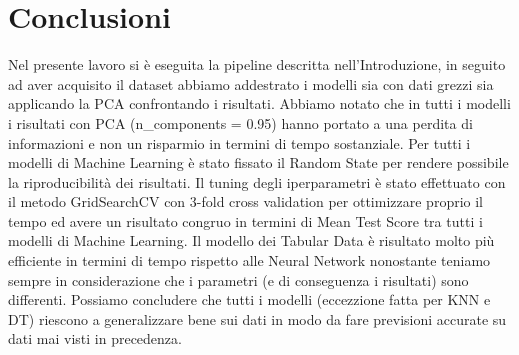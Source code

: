 \documentclass[../../Report.tex]{subfiles}
\begin{document}
\section{Conclusioni}
Nel presente lavoro si è eseguita la pipeline descritta nell'Introduzione, in seguito ad aver acquisito il dataset abbiamo addestrato i modelli sia con dati grezzi sia applicando la PCA confrontando i risultati.
Abbiamo notato che in tutti i modelli i risultati con PCA (n\_components = 0.95) hanno portato a una perdita di informazioni e non un risparmio in termini di tempo sostanziale.
Per tutti i modelli di Machine Learning è stato fissato il Random State per rendere possibile la riproducibilità dei risultati.
Il tuning degli iperparametri è stato effettuato con il metodo GridSearchCV con 3-fold cross validation per ottimizzare proprio il tempo ed avere un risultato congruo in termini di Mean Test Score tra tutti i modelli di Machine Learning.
Il modello dei Tabular Data è risultato molto più efficiente in termini di tempo rispetto alle Neural Network nonostante teniamo sempre in considerazione che i parametri (e di conseguenza i risultati) sono differenti.
Possiamo concludere che tutti i modelli (eccezzione fatta per KNN e DT) riescono a generalizzare bene sui dati in modo da fare previsioni accurate su dati mai visti in precedenza.
\end{document}
